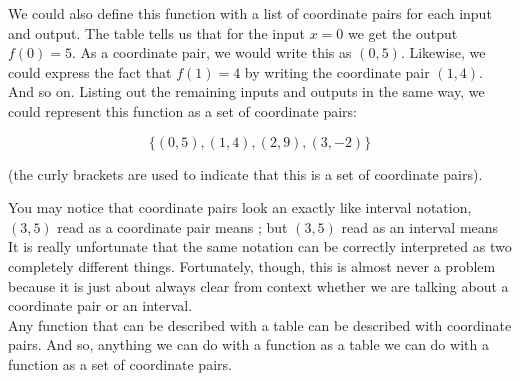 We could also define this function with a list of coordinate pairs for each input and output. The table tells us that for the input $x=0$ we get the output $f(0)=5$. As a coordinate pair, we would write this as $(0,5)$. Likewise, we could express the fact that $f(1)=4$ by writing the coordinate pair $(1,4)$. And so on. Listing out the remaining inputs and outputs in the same way, we could represent this function as a set of coordinate pairs:

$$\{(0,5),(1,4),(2,9),(3,-2)\}$$

(the curly brackets are used to indicate that this is a set of coordinate pairs).





\bigskip

You may notice that coordinate pairs look an exactly like interval notation, $(3,5)$ read as a coordinate pair means ; but $(3,5)$ read as an interval means  It is really unfortunate that the same notation can be correctly interpreted as two completely different things. Fortunately, though, this is almost never a problem because it is just about always clear from context whether we are talking about a coordinate pair or an interval.\\

Any function that can be described with a table can be described with coordinate pairs. And so, anything we can do with a function as a table we can do with a function as a set of coordinate pairs.

